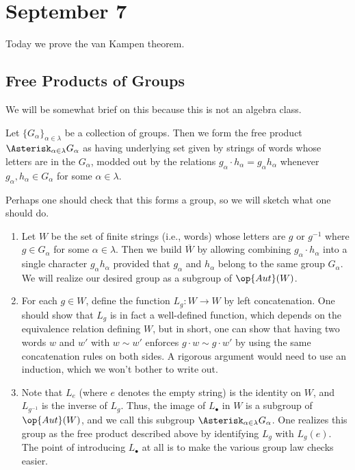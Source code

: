 \documentclass[../notes.tex]{subfiles}
\begin{document}
\section{September 7}

Today we prove the van Kampen theorem.

\subsection{Free Products of Groups}
We will be somewhat brief on this because this is not an algebra class.
\begin{definition}
	Let $\{G_\alpha\}_{\alpha\in\lambda}$ be a collection of groups. Then we form the free product $\Asterisk_{\alpha\in\lambda}G_\alpha$ as having underlying set given by strings of words whose letters are in the $G_\alpha$, modded out by the relations $g_\alpha\cdot h_\alpha=g_\alpha h_\alpha$ whenever $g_\alpha,h_\alpha\in G_\alpha$ for some $\alpha\in\lambda$.
\end{definition}
Perhaps one should check that this forms a group, so we will sketch what one should do.
\begin{enumerate}
	\item Let $W$ be the set of finite strings (i.e., words) whose letters are $g$ or $g^{-1}$ where $g\in G_\alpha$ for some $\alpha\in\lambda$. Then we build $\overline W$ by allowing combining $g_\alpha\cdot h_\alpha$ into a single character $g_\alpha h_\alpha$ provided that $g_\alpha$ and $h_\alpha$ belong to the same group $G_\alpha$. We will realize our desired group as a subgroup of $\op{Aut}(W)$.
	\item For each $g\in W$, define the function $L_g\colon W\to W$ by left concatenation. One should show that $L_g$ is in fact a well-defined function, which depends on the equivalence relation defining $W$, but in short, one can show that having two words $w$ and $w'$ with $w\sim w'$ enforces $g\cdot w\sim g\cdot w'$ by using the same concatenation rules on both sides. A rigorous argument would need to use an induction, which we won't bother to write out.
	\item Note that $L_e$ (where $e$ denotes the empty string) is the identity on $W$, and $L_{g^{-1}}$ is the inverse of $L_g$. Thus, the image of $L_\bullet$ in $W$ is a subgroup of $\op{Aut}(W)$, and we call this subgroup $\Asterisk_{\alpha\in\lambda}G_\alpha$. One realizes this group as the free product described above by identifying $L_g$ with $L_g(e)$. The point of introducing $L_\bullet$ at all is to make the various group law checks easier.
\end{enumerate}
\end{document}
